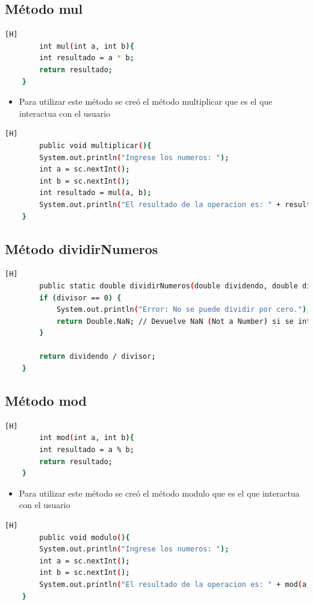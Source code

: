\documentclass{article}
\begin{document}
	\subsection{Método mul}
	\begin{lstlisting}[language=bash,caption={Código del método mul}][H]
		int mul(int a, int b){ 
        int resultado = a * b;
        return resultado; 
    }	
	\end{lstlisting}
	\begin{itemize}
		\item  Para utilizar este método se creó el método multiplicar que es el que interactua con el usuario
	\end{itemize}
	\begin{lstlisting}[language=bash,caption={Código del método multiplicar}][H]
		public void multiplicar(){
        System.out.println("Ingrese los numeros: ");
        int a = sc.nextInt();
        int b = sc.nextInt();
        int resultado = mul(a, b);
        System.out.println("El resultado de la operacion es: " + resultado);
    }
	\end{lstlisting}
	\subsection{Método dividirNumeros}
	\begin{lstlisting}[language=bash,caption={Código del método dividirNumeros}][H]
		public static double dividirNumeros(double dividendo, double divisor) {
        if (divisor == 0) {
            System.out.println("Error: No se puede dividir por cero.");
            return Double.NaN; // Devuelve NaN (Not a Number) si se intenta dividir por cero
        }
        
        return dividendo / divisor;
    }
	\end{lstlisting}
	\subsection{Método mod}
	\begin{lstlisting}[language=bash,caption={Código del método mod}][H]
		int mod(int a, int b){
        int resultado = a % b;
        return resultado; 
    }
	\end{lstlisting}
	\begin{itemize}
		\item  Para utilizar este método se creó el método modulo que es el que interactua con el usuario
	\end{itemize}
	\begin{lstlisting}[language=bash,caption={Código del método modulo}][H]
		public void modulo(){
        System.out.println("Ingrese los numeros: ");
        int a = sc.nextInt();
        int b = sc.nextInt();
        System.out.println("El resultado de la operacion es: " + mod(a, b));
    }
	\end{lstlisting}
\end{document}
